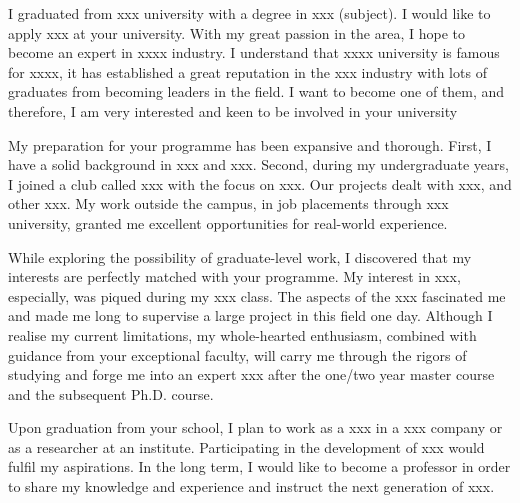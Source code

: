 \documentclass{statement}
\begin{document}
\maketitle

I graduated from xxx university with a degree in xxx (subject). I would like to apply xxx at your university. With my great passion in the area, I hope to become an expert in xxxx industry. I understand that xxxx university is famous for xxxx, it has established a great reputation in the xxx industry with lots of graduates from becoming leaders in the field. I want to become one of them, and therefore, I am very interested and keen to be involved in your university

My preparation for your programme has been expansive and thorough. First, I have a solid background in xxx and xxx. Second, during my undergraduate years, I joined a club called xxx with the focus on xxx. Our projects dealt with xxx, and other xxx. My work outside the campus, in job placements through xxx university, granted me excellent opportunities for real-world experience.

While exploring the possibility of graduate-level work, I discovered that my interests are perfectly matched with your programme. My interest in xxx, especially, was piqued during my xxx class. The aspects of the xxx fascinated me and made me long to supervise a large project in this field one day. Although I realise my current limitations, my whole-hearted enthusiasm, combined with guidance from your exceptional faculty, will carry me through the rigors of studying and forge me into an expert xxx after the one/two year master course and the subsequent Ph.D. course.

Upon graduation from your school, I plan to work as a xxx in a xxx company or as a researcher at an institute. Participating in the development of xxx would fulfil my aspirations. In the long term, I would like to become a professor in order to share my knowledge and experience and instruct the next generation of xxx.
\end{document}
